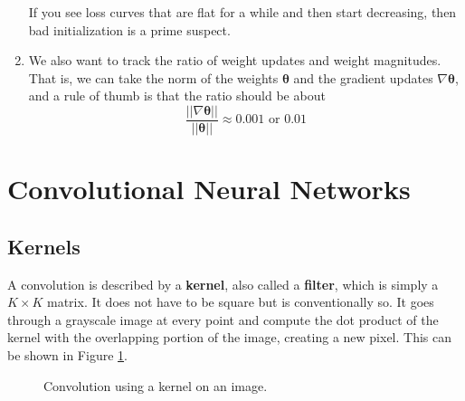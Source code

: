\documentclass{article}
\theoremstyle{definition}
\theoremstyle{remark}
\theoremstyle{definition}
\begin{document}
\begin{enumerate}
\begin{center}
    \end{center}
    If you see loss curves that are flat for a while and then start decreasing, then bad initialization is a prime suspect. 
    \item We also want to track the ratio of weight updates and weight magnitudes. That is, we can take the norm of the weights $\boldsymbol{\theta}$ and the gradient updates $\nabla \boldsymbol{\theta}$, and a rule of thumb is that the ratio should be about 
    \[\frac{||\nabla \boldsymbol{\theta}||}{||\boldsymbol{\theta}||} \approx 0.001 \text{ or } 0.01\]
\end{enumerate}



\section{Convolutional Neural Networks}

\subsection{Kernels}

A convolution is described by a \textbf{kernel}, also called a \textbf{filter}, which is simply a $K \times K$ matrix. It does not have to be square but is conventionally so. It goes through a grayscale image at every point and compute the dot product of the kernel with the overlapping portion of the image, creating a new pixel. This can be shown in Figure \ref{fig:convolution}. 

\begin{figure}
\centering
{}
\caption{Convolution using a kernel on an image.}
\label{fig:convolution}
\end{figure}
\end{document}
